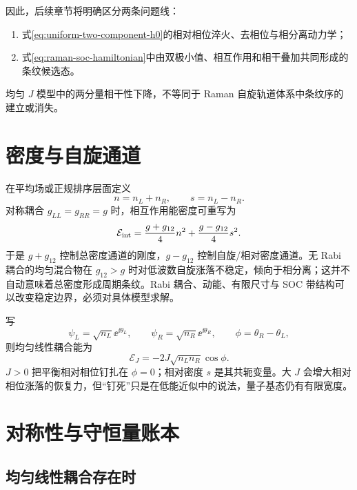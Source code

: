 因此，后续章节将明确区分两条问题线：
\begin{enumerate}
  \item 式\eqref{eq:uniform-two-component-h0}的相对相位淬火、去相位与相分离动力学；
  \item 式\eqref{eq:raman-soc-hamiltonian}中由双极小值、相互作用和相干叠加共同形成的条纹候选态。
\end{enumerate}
均匀 $J$ 模型中的两分量相干性下降，不等同于 Raman 自旋轨道体系中条纹序的建立或消失。

\section{密度与自旋通道}

在平均场或正规排序层面定义
\begin{equation}
  n=n_L+n_R,
  \qquad
  s=n_L-n_R.
\end{equation}
对称耦合 $g_{LL}=g_{RR}=g$ 时，相互作用能密度可重写为
\begin{equation}
  \mathcal E_{\rm int}
  =\frac{g+g_{12}}{4}n^2
  +\frac{g-g_{12}}{4}s^2.
  \label{eq:density-spin-interaction}
\end{equation}
于是 $g+g_{12}$ 控制总密度通道的刚度，$g-g_{12}$ 控制自旋/相对密度通道。无 Rabi 耦合的均匀混合物在 $g_{12}>g$ 时对低波数自旋涨落不稳定，倾向于相分离；这并不自动意味着总密度形成周期条纹。Rabi 耦合、动能、有限尺寸与 SOC 带结构可以改变稳定边界，必须对具体模型求解。

写
\begin{equation}
  \psi_L=\sqrt{n_L}\ee^{\ii\theta_L},
  \qquad
  \psi_R=\sqrt{n_R}\ee^{\ii\theta_R},
  \qquad
  \phi=\theta_R-\theta_L,
\end{equation}
则均匀线性耦合能为
\begin{equation}
  \mathcal E_J=-2J\sqrt{n_Ln_R}\cos\phi.
  \label{eq:josephson-phase-energy}
\end{equation}
$J>0$ 把平衡相对相位钉扎在 $\phi=0$；相对密度 $s$ 是其共轭变量。大 $J$ 会增大相对相位涨落的恢复力，但“钉死”只是在低能近似中的说法，量子基态仍有有限宽度。

\section{对称性与守恒量账本}

\subsection{均匀线性耦合存在时}

